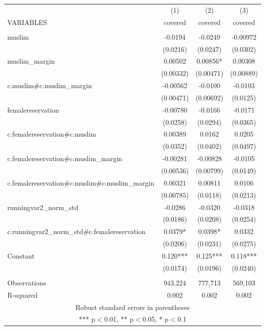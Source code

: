 \documentclass[]{article}
\begin{document}
\begin{tabular}{lccc} \hline
 & (1) & (2) & (3) \\
VARIABLES & covered & covered & covered \\ \hline
 &  &  &  \\
muslim & -0.0194 & -0.0249 & -0.00972 \\
 & (0.0216) & (0.0247) & (0.0302) \\
muslim\_margin & 0.00502 & 0.00856* & 0.00308 \\
 & (0.00332) & (0.00471) & (0.00889) \\
c.muslim\#c.muslim\_margin & -0.00562 & -0.0100 & -0.0103 \\
 & (0.00471) & (0.00692) & (0.0125) \\
femalereservation & -0.00780 & -0.0166 & -0.0171 \\
 & (0.0258) & (0.0294) & (0.0365) \\
c.femalereservation\#c.muslim & 0.00389 & 0.0162 & 0.0205 \\
 & (0.0352) & (0.0402) & (0.0497) \\
c.femalereservation\#c.muslim\_margin & -0.00281 & -0.00828 & -0.0105 \\
 & (0.00536) & (0.00799) & (0.0149) \\
c.femalereservation\#c.muslim\#c.muslim\_margin & 0.00321 & 0.00811 & 0.0106 \\
 & (0.00785) & (0.0118) & (0.0213) \\
runningvar2\_norm\_std & -0.0286 & -0.0320 & -0.0318 \\
 & (0.0186) & (0.0208) & (0.0254) \\
c.runningvar2\_norm\_std\#c.femalereservation & 0.0379* & 0.0398* & 0.0332 \\
 & (0.0206) & (0.0231) & (0.0275) \\
Constant & 0.120*** & 0.125*** & 0.118*** \\
 & (0.0174) & (0.0196) & (0.0240) \\
 &  &  &  \\
Observations & 943,224 & 777,713 & 569,103 \\
 R-squared & 0.002 & 0.002 & 0.002 \\ \hline
\multicolumn{4}{c}{ Robust standard errors in parentheses} \\
\multicolumn{4}{c}{ *** p$<$0.01, ** p$<$0.05, * p$<$0.1} \\
\end{tabular}
\end{document}
